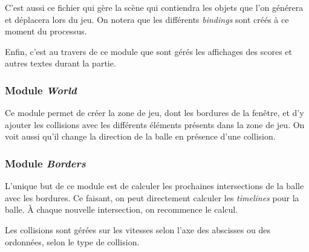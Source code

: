 \documentclass[a4paper,10pt]{article}
\theoremstyle{definition}
\begin{document}
	C'est aussi ce fichier qui gère la scène qui contiendra les objets que l'on générera et déplacera lors du jeu. On notera que les différents \emph{bindings} sont créés à ce moment du processus.
	
	Enfin, c'est au travers de ce module que sont gérés les affichages des scores et autres textes durant la partie.
	
        \subsubsection{Module \emph{World}}
        Ce module permet de créer la zone de jeu, dont les bordures de la fenêtre, et d'y ajouter les collisions avec les différents éléments présents dans la zone de jeu. On voit aussi qu'il change la direction de la balle en présence d'une collision.
        
        \subsubsection{Module \emph{Borders}}
        L'unique but de ce module est de calculer les prochaines intersections de la balle avec les bordures. Ce faisant, on peut directement calculer les \emph{timelines} pour la balle. À chaque nouvelle intersection, on recommence le calcul.
        
        Les collisions sont gérées sur les vitesses selon l'axe des abscisses ou des ordonnées, selon le type de collision. 
\end{document}
